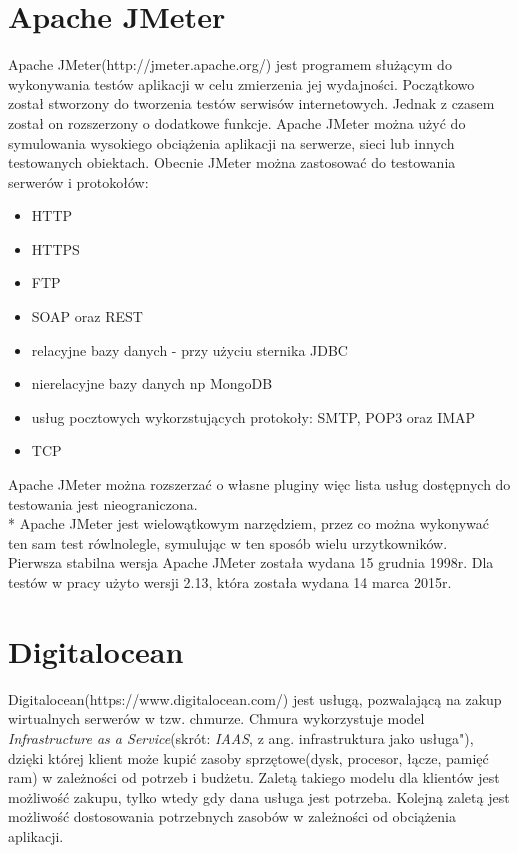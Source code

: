 \section{Apache JMeter}
Apache JMeter(http://jmeter.apache.org/) jest programem służącym do wykonywania testów aplikacji w celu zmierzenia jej wydajności.  Początkowo został stworzony do tworzenia testów serwisów internetowych. Jednak z czasem został on rozszerzony o dodatkowe funkcje. Apache JMeter można użyć do symulowania wysokiego obciążenia aplikacji na serwerze, sieci lub innych testowanych obiektach.
Obecnie JMeter można zastosować do testowania serwerów i protokołów:
\begin{itemize}
\item HTTP
\item HTTPS
\item FTP
\item SOAP oraz REST
\item relacyjne bazy danych - przy użyciu sternika JDBC
\item nierelacyjne bazy danych np MongoDB
\item usług pocztowych wykorzstujących protokoły: SMTP, POP3 oraz IMAP
\item TCP
\end{itemize}
Apache JMeter można rozszerzać o własne pluginy więc lista usług dostępnych do testowania jest nieograniczona. \\*
Apache JMeter jest wielowątkowym narzędziem, przez co można wykonywać ten sam test rówlnolegle, symulując w ten sposób wielu urzytkowników. \\
Pierwsza stabilna wersja Apache JMeter została wydana 15 grudnia 1998r. Dla testów w pracy użyto wersji 2.13, która została wydana 14 marca 2015r.

\section{Digitalocean}
Digitalocean(https://www.digitalocean.com/) jest usługą, pozwalającą na zakup wirtualnych serwerów w tzw. chmurze. Chmura wykorzystuje model \textsl{Infrastructure as a Service}(skrót: \textsl{IAAS}, z ang. infrastruktura jako usługa"), dzięki której klient może kupić zasoby sprzętowe(dysk, procesor, łącze, pamięć ram) w zależności od potrzeb i budżetu. Zaletą takiego modelu dla klientów jest możliwość zakupu, tylko wtedy gdy dana usługa jest potrzeba. Kolejną zaletą jest możliwość dostosowania potrzebnych zasobów w zależności od obciążenia aplikacji.